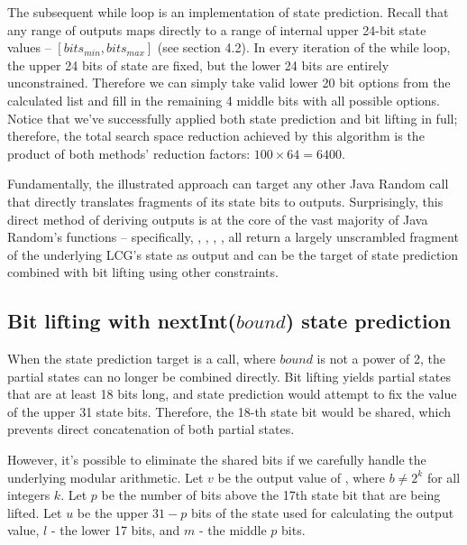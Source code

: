 \documentclass{article}
\begin{document}
The subsequent while loop is an implementation of  state prediction. Recall that any range of  outputs maps directly to a range of internal upper 24-bit state values -- $[bits_{min}, bits_{max}]$ (see section 4.2). %
In every iteration of the while loop, the upper 24 bits of state are fixed, but the lower 24 bits are entirely unconstrained. 
Therefore we can simply take valid lower 20 bit options from the calculated list and fill in the remaining 4 middle bits with all possible options. 
Notice that we've successfully applied both state prediction and bit lifting in full; therefore, the total search space reduction achieved by this algorithm is the product of both methods' reduction factors: $100 \times 64 = 6400$.

Fundamentally, the illustrated approach can target any other Java Random call that directly translates fragments of its state bits to outputs.
Surprisingly, this direct method of deriving outputs is at the core of the vast majority of Java Random's functions -- specifically,  , , , ,  all return a largely unscrambled fragment of the underlying LCG's state as output and can be the target of state prediction combined with bit lifting using other constraints.

\subsection{Bit lifting with nextInt($bound$) state prediction}

When the state prediction target is a  call, where $bound$ is not a power of 2, the partial states can no longer be combined directly. 
Bit lifting yields partial states that are at least 18 bits long, and state prediction would attempt to fix the value of the upper 31 state bits. 
Therefore, the 18-th state bit would be shared, which prevents direct concatenation of both partial states. 

However, it's possible to eliminate the shared bits if we carefully handle the underlying modular arithmetic. Let $v$ be the output value of , where $b \neq 2^k$ for all integers $k$. Let $p$ be the number of bits above the 17th state bit that are being lifted. Let $u$ be the upper $31 - p$ bits of the state used for calculating the output value, $l$ - the lower 17 bits, and $m$ - the middle $p$ bits.
\end{document}
